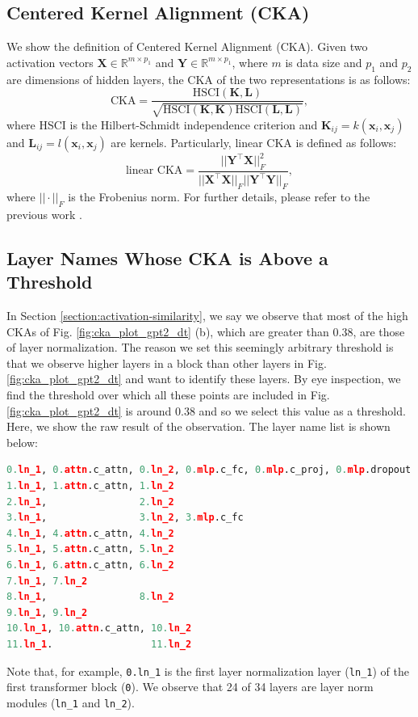 \documentclass{article}
\begin{document}
\subsection{Centered Kernel Alignment (CKA)}
\label{appendix:cka}
We show the definition of Centered Kernel Alignment (CKA). Given two activation vectors $\bm{X} \in \mathbb{R}^{m \times p_1}$ and $\bm{Y} \in \mathbb{R}^{m \times p_1}$, where $m$ is data size and $p_1$ and $p_2$ are dimensions of hidden layers, the CKA of the two representations is as follows:
 \begin{equation}
     \text{CKA} = \frac{\text{HSCI}(\bm{K}, \bm{L})}{\sqrt{\text{HSCI}(\bm{K}, \bm{K})\text{HSCI}(\bm{L}, \bm{L})}},
 \end{equation}
 where HSCI is the Hilbert-Schmidt independence criterion \cite{gretton2007kernel} and $\bm{K}_{ij} = k(\bm{x}_i, \bm{x}_j)$ and $\bm{L}_{ij} = l(\bm{x}_i, \bm{x}_j)$ are kernels. Particularly, linear CKA is defined as follows:
  \begin{equation}
     \text{linear CKA} = \frac{||\bm{Y}^{\top} \bm{X}||_F^2}{||\bm{X}^{\top} \bm{X}||_F||\bm{Y}^{\top}\bm{Y}||_F},
 \end{equation}
 where $||\cdot||_F$ is the Frobenius norm. For further details, please refer to the previous work \cite{kornblith2019similarity}.
 
\subsection{Layer Names Whose CKA is Above a Threshold}
\label{appendix:layer-name-cka}
In Section \ref{section:activation-similarity}, we say we observe that most of the high CKAs of Fig. \ref{fig:cka_plot_gpt2_dt} (b), which are greater than 0.38, are those of layer normalization. The reason we set this seemingly arbitrary threshold is that we observe higher layers in a block than other layers in Fig. \ref{fig:cka_plot_gpt2_dt} and want to identify these layers. By eye inspection, we find the threshold over which all these points are included in Fig. \ref{fig:cka_plot_gpt2_dt} is around 0.38 and so we select this value as a threshold. 
Here, we show the raw result of the observation. The layer name list is shown below:
\begin{lstlisting}[language=Python, caption=Layer names whose CKA is above a threshold]
0.ln_1, 0.attn.c_attn, 0.ln_2, 0.mlp.c_fc, 0.mlp.c_proj, 0.mlp.dropout
1.ln_1, 1.attn.c_attn, 1.ln_2
2.ln_1,                2.ln_2
3.ln_1,                3.ln_2, 3.mlp.c_fc
4.ln_1, 4.attn.c_attn, 4.ln_2
5.ln_1, 5.attn.c_attn, 5.ln_2
6.ln_1, 6.attn.c_attn, 6.ln_2
7.ln_1, 7.ln_2
8.ln_1,                8.ln_2
9.ln_1, 9.ln_2
10.ln_1, 10.attn.c_attn, 10.ln_2
11.ln_1.                 11.ln_2
\end{lstlisting}
Note that, for example, \lstinline{0.ln_1} is the first layer normalization layer (\lstinline{ln_1}) of the first transformer block (\lstinline{0}). We observe that 24 of 34 layers are layer norm modules (\lstinline{ln_1} and \lstinline{ln_2}).
\end{document}

